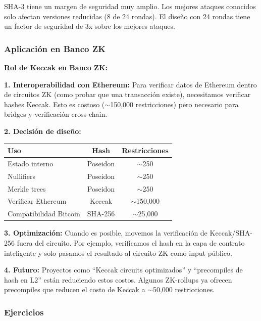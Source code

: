 \documentclass[11pt,a4paper,twoside,openright]{book}
\theoremstyle{definition}
\theoremstyle{plain}
\theoremstyle{remark}
\begin{document}
\begin{keyidea}
SHA-3 tiene un margen de seguridad muy amplio. Los mejores ataques conocidos solo afectan versiones reducidas (8 de 24 rondas). El diseño con 24 rondas tiene un factor de seguridad de 3x sobre los mejores ataques.
\end{keyidea}

\subsubsection{Aplicación en Banco ZK}

\begin{bancozk}
\textbf{Rol de Keccak en Banco ZK:}

\textbf{1. Interoperabilidad con Ethereum:}
Para verificar datos de Ethereum dentro de circuitos ZK (como probar que una transacción existe), necesitamos verificar hashes Keccak. Esto es costoso ($\sim$150,000 restricciones) pero necesario para bridges y verificación cross-chain.

\textbf{2. Decisión de diseño:}
\begin{center}
\begin{tabular}{lcc}
\toprule
\textbf{Uso} & \textbf{Hash} & \textbf{Restricciones} \\
\midrule
Estado interno & Poseidon & $\sim$250 \\
Nullifiers & Poseidon & $\sim$250 \\
Merkle trees & Poseidon & $\sim$250 \\
Verificar Ethereum & Keccak & $\sim$150,000 \\
Compatibilidad Bitcoin & SHA-256 & $\sim$25,000 \\
\bottomrule
\end{tabular}
\end{center}

\textbf{3. Optimización:}
Cuando es posible, movemos la verificación de Keccak/SHA-256 fuera del circuito. Por ejemplo, verificamos el hash en la capa de contrato inteligente y solo pasamos el resultado al circuito ZK como input público.

\textbf{4. Futuro:}
Proyectos como ``Keccak circuits optimizados'' y ``precompiles de hash en L2'' están reduciendo estos costos. Algunos ZK-rollups ya ofrecen precompiles que reducen el costo de Keccak a $\sim$50,000 restricciones.
\end{bancozk}

\subsubsection{Ejercicios}
\end{document}
